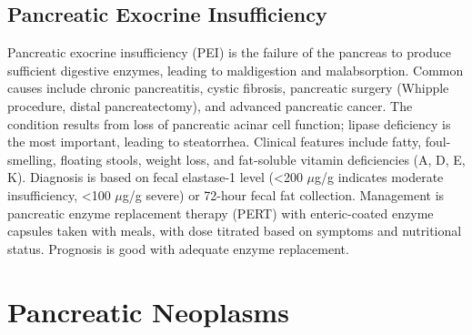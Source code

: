 



\label{sec:section:Pancreatic Exocrine Insufficiency}

\subsection{Pancreatic Exocrine Insufficiency}
\label{sec:Pancreatic Exocrine Insufficiency}
Pancreatic exocrine insufficiency (PEI) is the failure of the pancreas to produce sufficient digestive enzymes, leading to maldigestion and malabsorption. Common causes include chronic pancreatitis, cystic fibrosis, pancreatic surgery (Whipple procedure, distal pancreatectomy), and advanced pancreatic cancer. The condition results from loss of pancreatic acinar cell function; lipase deficiency is the most important, leading to steatorrhea. Clinical features include fatty, foul-smelling, floating stools, weight loss, and fat-soluble vitamin deficiencies (A, D, E, K). Diagnosis is based on fecal elastase-1 level (<200 $\mu$g/g indicates moderate insufficiency, <100 $\mu$g/g severe) or 72-hour fecal fat collection. Management is pancreatic enzyme replacement therapy (PERT) with enteric-coated enzyme capsules taken with meals, with dose titrated based on symptoms and nutritional status. Prognosis is good with adequate enzyme replacement.

\section{Pancreatic Neoplasms}





